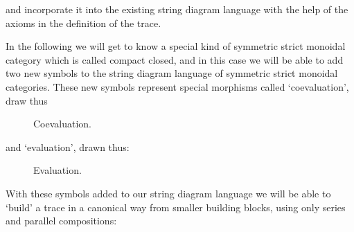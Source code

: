 and incorporate it into the existing string diagram language with the help of the axioms in the definition of the trace. 


In the following we will get to know a special kind of symmetric strict monoidal category which is called compact closed, and in this case we will be able to add two new symbols to the string diagram language of symmetric strict monoidal categories. These new symbols represent special morphisms called `coevaluation', draw thus
\begin{figure}[h!]
    \centering
    \caption{Coevaluation.}
    \label{fig:coev-string}
\end{figure}

and `evaluation', drawn thus:

\begin{figure}[h!]
    \centering
    \caption{Evaluation.}
    \label{fig:ev-string}
\end{figure}



With these symbols added to our string diagram language we will be able to `build' a trace in a canonical way from smaller building blocks, using only series and parallel compositions:

